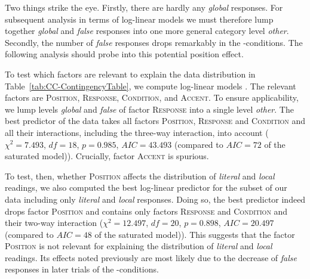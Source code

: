 \documentclass[fleqn,reqno,10pt]{article}
\renewcommand{\es}{\acro{es}}
\begin{document}
Two things strike the eye. Firstly, there are hardly any \emph{global}
responses. For subsequent analysis in terms of log-linear models we
must therefore lump together \emph{global} and \emph{false} responses
into one more general category level \emph{other}. Secondly, the
number of \emph{false} responses drops remarkably in the
\es-conditions. The following analysis should probe into this
potential position effect.




To test which factors are relevant to explain the data distribution in
Table~\ref{tab:CC-ContingencyTable}, we compute log-linear models
\citep{KnokeBurke1980:Log-Linear-Mode}. The relevant factors are
\textsc{Position}, \textsc{Response}, \textsc{Condition}, and
\textsc{Accent}. To ensure applicability, we lump levels \emph{global}
and \emph{false} of factor \textsc{Response} into a single level
\emph{other}. The best predictor of the data takes all factors
\textsc{Position}, \textsc{Response} and \textsc{Condition} and all
their interactions, including the three-way interaction, into account
($\chi^2 = 7.493$, $df=18$, $p = 0.985$, $AIC = 43.493$ (compared to
$AIC=72$ of the saturated model)). Crucially, factor \textsc{Accent}
is spurious.


To test, then, whether \textsc{Position} affects the distribution of
\emph{literal} and \emph{local} readings, we also computed the best
log-linear predictor for the subset of our data including only
\emph{literal} and \emph{local} responses. Doing so, the best
predictor indeed drops factor \textsc{Position} and contains only
factors \textsc{Response} and \textsc{Condition} and their two-way
interaction ($\chi^2 = 12.497$, $df=20$, $p = 0.898$, $AIC = 20.497$
(compared to $AIC=48$ of the saturated model)). This suggests that the
factor \textsc{Position} is not relevant for explaining the
distribution of \emph{literal} and \emph{local} readings. Its effects
noted previously are most likely due to the decrease of \emph{false}
responses in later trials of the \es-conditions.
\end{document}
